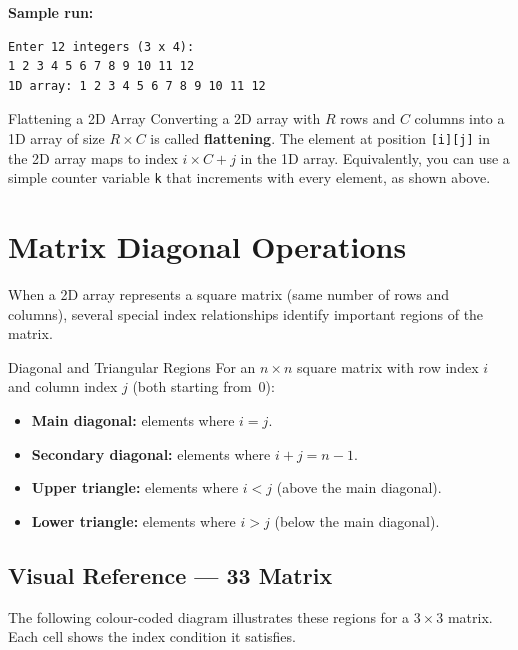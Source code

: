 \textbf{Sample run:}
\begin{verbatim}
Enter 12 integers (3 x 4):
1 2 3 4 5 6 7 8 9 10 11 12
1D array: 1 2 3 4 5 6 7 8 9 10 11 12
\end{verbatim}

\begin{conceptbox}{Flattening a 2D Array}
Converting a 2D array with $R$ rows and $C$ columns into a 1D array of
size $R \times C$ is called \textbf{flattening}. The element at position
\texttt{[i][j]} in the 2D array maps to index $i \times C + j$ in the
1D array. Equivalently, you can use a simple counter variable \texttt{k}
that increments with every element, as shown above.
\end{conceptbox}

\section{Matrix Diagonal Operations}
\label{sec:diagonal-operations}

When a 2D array represents a square matrix (same number of rows and
columns), several special index relationships identify important regions
of the matrix.

\begin{definitionbox}{Diagonal and Triangular Regions}
For an $n \times n$ square matrix with row index $i$ and column index $j$
(both starting from~0):
\begin{itemize}
    \item \textbf{Main diagonal:} elements where $i = j$.
    \item \textbf{Secondary diagonal:} elements where
          $i + j = n - 1$.
    \item \textbf{Upper triangle:} elements where $i < j$
          (above the main diagonal).
    \item \textbf{Lower triangle:} elements where $i > j$
          (below the main diagonal).
\end{itemize}
\end{definitionbox}

\subsection*{Visual Reference --- 3\texorpdfstring{\texttimes}{x}3
             Matrix}

The following colour-coded diagram illustrates these regions for a
$3 \times 3$ matrix. Each cell shows the index condition it satisfies.

